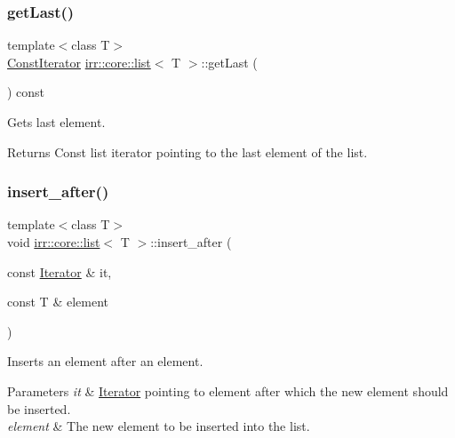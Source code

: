 \subsubsection{\texorpdfstring{get\+Last()}{getLast()}\hspace{0.1cm}{\footnotesize\ttfamily [2/2]}}
{\footnotesize\ttfamily template$<$class T$>$ \\
\hyperlink{classirr_1_1core_1_1list_1_1ConstIterator}{Const\+Iterator} \hyperlink{classirr_1_1core_1_1list}{irr\+::core\+::list}$<$ T $>$\+::get\+Last (\begin{DoxyParamCaption}{ }\end{DoxyParamCaption}) const\hspace{0.3cm}{\ttfamily [inline]}}



Gets last element. 

\begin{DoxyReturn}{Returns}
Const list iterator pointing to the last element of the list. 
\end{DoxyReturn}
\mbox{\label{classirr_1_1core_1_1list_aa4b91d7a9191fc98266425366b774c8a}} 
\subsubsection{\texorpdfstring{insert\+\_\+after()}{insert\_after()}}
{\footnotesize\ttfamily template$<$class T$>$ \\
void \hyperlink{classirr_1_1core_1_1list}{irr\+::core\+::list}$<$ T $>$\+::insert\+\_\+after (\begin{DoxyParamCaption}\item[{const \hyperlink{classirr_1_1core_1_1list_1_1Iterator}{Iterator} \&}]{it,  }\item[{const T \&}]{element }\end{DoxyParamCaption})\hspace{0.3cm}{\ttfamily [inline]}}



Inserts an element after an element. 


\begin{DoxyParams}{Parameters}
{\em it} & \hyperlink{classirr_1_1core_1_1list_1_1Iterator}{Iterator} pointing to element after which the new element should be inserted. \\
\hline
{\em element} & The new element to be inserted into the list. \\
\hline
\end{DoxyParams}
\mbox{\label{classirr_1_1core_1_1list_a366070e0356029f0b355f5dd81710b29}} 
